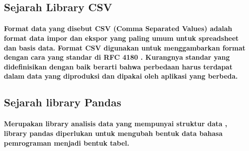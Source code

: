 \documentclass[a4paper, 12pt]{article}
\begin{document}
\subsection{Sejarah Library CSV}
\paragraph{Format data yang disebut CSV (Comma Separated Values) adalah format data impor dan ekspor yang paling umum untuk spreadsheet dan basis data. Format CSV digunakan untuk menggambarkan format dengan cara yang standar di RFC 4180 . Kurangnya standar yang didefinisikan dengan baik berarti bahwa perbedaan harus terdapat dalam data yang diproduksi dan dipakai oleh aplikasi yang berbeda.}

\subsection{Sejarah library Pandas}
\paragraph{Merupakan library analisis data yang mempunyai struktur data , library pandas diperlukan untuk mengubah bentuk data bahasa pemrograman menjadi bentuk tabel.}
\end{document}

